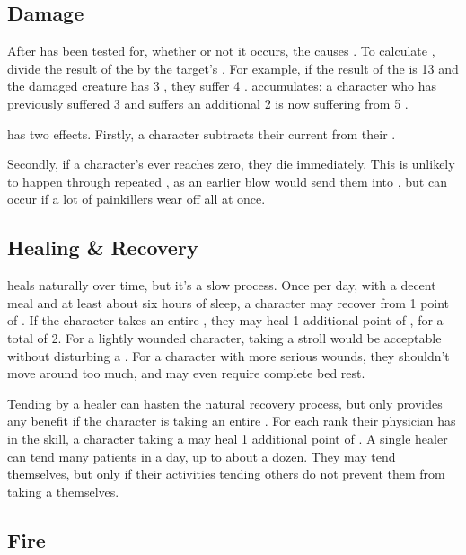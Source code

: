 \subsection{Damage}

After {\shock} has been tested for, whether or not it occurs, the {\damagetest} causes {\damage}.
To calculate {\damage}, divide the result of the {\damagetest} by the target's .
For example, if the result of the {\damagetest} is 13 and the damaged creature has 3 , they suffer 4 {\damage}.
{\damage} accumulates: a character who has previously suffered 3 {\damage} and suffers an additional 2 is now suffering from 5 {\damage}.

\capital{\damage} has two effects.
Firstly, a character subtracts their current {\damage} from their .

Secondly, if a character's  ever reaches zero, they die immediately.
This is unlikely to happen through repeated {\damage}, as an earlier blow would send them into {\shock}, but can occur if a lot of painkillers wear off all at once.

\subsection{Healing \& Recovery}

\capital{\damage} heals naturally over time, but it's a slow process.
Once per day, with a decent meal and at least about six hours of sleep, a character may recover from 1 point of {\damage}.
If the character takes an entire {\dayofrest}, they may heal 1 additional point of {\damage}, for a total of 2.
For a lightly wounded character, taking a stroll would be acceptable without disturbing a {\dayofrest}.
For a character with more serious wounds, they shouldn't move around too much, and may even require complete bed rest.

Tending by a healer can hasten the natural recovery process, but only provides any benefit if the character is taking an entire {\dayofrest}.
For each rank their physician has in the  skill, a character taking a {\dayofrest} may heal 1 additional point of {\damage}.
A single healer can tend many patients in a day, up to about a dozen.
They may tend themselves, but only if their activities tending others do not prevent them from taking a {\dayofrest} themselves.

\subsection{Fire}

